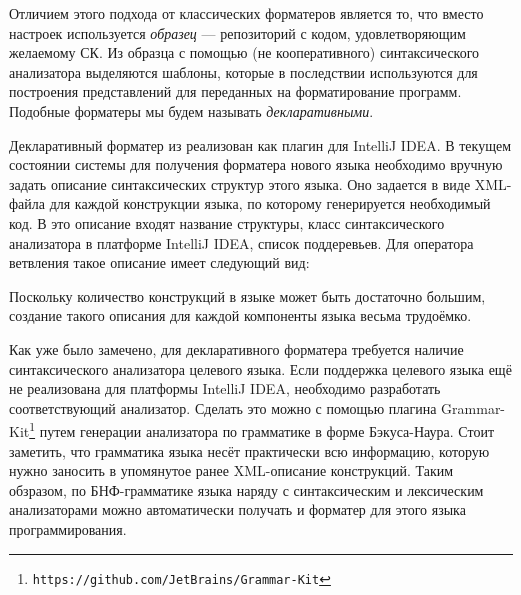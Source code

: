 \documentclass[conference]{IEEEtran}
\begin{document}
Отличием этого подхода от классических форматеров является то, что вместо
настроек используется \emph{образец} --- репозиторий с кодом, 
удовлетворяющим желаемому СК. Из образца с помощью (не кооперативного)
синтаксического анализатора выделяются шаблоны, которые в последствии
используются для построения представлений для переданных на форматирование
программ.
Подобные форматеры мы будем называть \emph{декларативными}.


Декларативный форматер из \cite{while} реализован как плагин для
IntelliJ IDEA. В текущем состоянии системы для 
получения форматера нового языка необходимо вручную задать описание
синтаксических структур этого языка.
Оно задается в виде XML-файла для каждой конструкции языка,
по которому генерируется необходимый код.
В это описание входят название структуры, класс синтаксического анализатора
в платформе IntelliJ IDEA, список поддеревьев.
Для оператора ветвления такое описание имеет следующий вид:



\noindent
Поскольку количество конструкций в языке может быть достаточно большим,
создание такого описания для каждой компоненты языка весьма трудоёмко.


Как уже было замечено, для декларативного форматера требуется наличие
синтаксического анализатора целевого языка.
Если поддержка целевого языка ещё не реализована для платформы
IntelliJ IDEA, необходимо разработать соответствующий анализатор.
Сделать это можно с помощью плагина
Grammar-Kit\footnote{\texttt{https://github.com/JetBrains/Grammar-Kit}}
путем генерации анализатора по грамматике в форме Бэкуса-Наура.
Стоит заметить, что грамматика языка несёт практически всю информацию,
которую нужно заносить в упомянутое ранее XML-описание конструкций.
Таким обзразом, по БНФ-грамматике языка наряду с синтаксическим и
лексическим анализаторами можно автоматически получать и форматер
для этого языка программирования.
\end{document}
